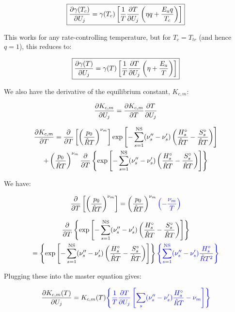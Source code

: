 \documentclass[10pt]{article}
\begin{document}
\begin{flushleft}
\begin{equation}
    \boxed{\frac{\partial \gamma(T_c)}{\partial U_j} = \gamma(T_c) \left[  \frac{1}{T} \frac{\partial T}{\partial U_j} \left(  \eta q + \frac{E_a q}{T_c} \right) \right] }
\end{equation}

This works for any rate-controlling temperature, but for $T_c = T_{tr}$ (and hence $q = 1$), this reduces to:

\begin{equation}
    \boxed{\frac{\partial \gamma(T)}{\partial U_j} = \gamma(T) \left[  \frac{1}{T} \frac{\partial T}{\partial U_j} \left( \eta + \frac{E_a}{T} \right) \right]}
\end{equation}

We also have the derivative of the equilibrium constant, $K_{c,m}$:

\begin{equation}
    \frac{\partial K_{c,m}}{\partial U_j} = \frac{\partial K_{c,m}}{\partial T} \frac{\partial T}{\partial U_j}
\end{equation}

\begin{multline}
    \frac{\partial K_{c,m}}{\partial T} = \frac{\partial }{\partial T} \left[ \left( \frac{p_0}{\hat{R}T} \right)^{\nu_m} \right] \exp{\left[ -\sum_{s=1}^\text{NS} (\nu_s'' - \nu_s') \left( \frac{H_s^\circ}{\hat{R}T} - \frac{S_s^\circ}{\hat{R}T} \right) \right]}
    \\ + \left( \frac{p_0}{\hat{R}T} \right)^{\nu_m} \frac{\partial }{\partial T} \left\{ \exp{\left[ -\sum_{s=1}^\text{NS} (\nu_s'' - \nu_s') \left( \frac{H_s^\circ}{\hat{R}T} - \frac{S_s^\circ}{\hat{R}T} \right) \right]} \right\}
\end{multline}

We have:

\begin{equation}
    \frac{\partial }{\partial T} \left[ \left( \frac{p_0}{\hat{R}T} \right)^{\nu_m} \right] = \left( \frac{p_0}{\hat{R}T} \right)^{\nu_m} \textcolor{blue}{\left( -\frac{\nu_m}{T} \right)}
\end{equation}


\begin{multline}    
    \frac{\partial }{\partial T} \left\{ \exp{\left[ -\sum_{s=1}^\text{NS} (\nu_s'' - \nu_s') \left( \frac{H_s^\circ}{\hat{R}T} - \frac{S_s^\circ}{\hat{R}T} \right) \right]} \right\} 
    \\ = \left\{ \exp{\left[ -\sum_{s=1}^\text{NS} (\nu_s'' - \nu_s') \left( \frac{H_s^\circ}{\hat{R}T} - \frac{S_s^\circ}{\hat{R}T} \right) \right]} \right\} \textcolor{blue}{\left\{ \sum_{s=1}^\text{NS} (\nu_s'' - \nu_s') \frac{H_s^\circ}{\hat{R}T^2}  \right\}}
\end{multline}

Plugging these into the master equation gives:

\begin{equation}
    \frac{\partial K_{c,m}(T)}{\partial U_j} = K_{c,m} (T) \textcolor{blue}{\left\{ \frac{1}{T} \frac{\partial T}{\partial U_j} \left[ \sum_s(\nu_s'' - \nu_s') \frac{H_s^\circ}{\hat{R}T} - \nu_m \right] \right\}}
\end{equation}


\end{flushleft}
\end{document}
